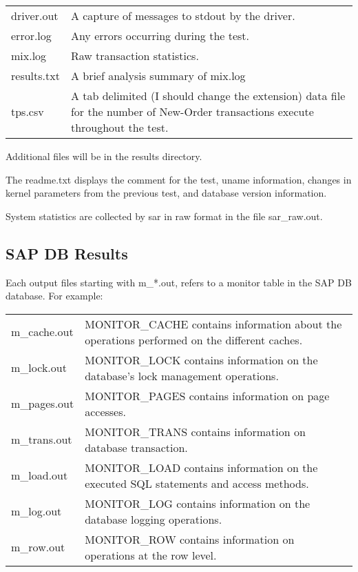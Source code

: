 \documentclass{article}
\begin{document}
\begin{tabular}[c]{ll}
driver.out	&	A capture of messages to stdout by the driver. \\
error.log	&	Any errors occurring during the test. \\
mix.log		&	Raw transaction statistics. \\
results.txt	&	A brief analysis summary of mix.log \\
tps.csv		&	A tab delimited (I should change the extension) data
			file for the number of New-Order transactions execute
			throughout the test. \\
\end{tabular}

\noindent
Additional files will be in the results directory.

\noindent
The readme.txt displays the comment for the test, uname  information, changes
in kernel parameters from the previous test, and database version information.

\noindent
System statistics are collected by sar in raw format in the file sar\_raw.out.

\subsection{SAP DB Results}

Each output files starting with m\_*.out, refers to a monitor table in the
SAP DB database.  For example:

\begin{tabular}[c]{ll}
m\_cache.out	&	MONITOR\_CACHE contains information about the operations
			performed on the different caches. \\
m\_lock.out	&	MONITOR\_LOCK contains information on the database's
			lock management operations. \\
m\_pages.out	&	MONITOR\_PAGES contains information on page accesses. \\
m\_trans.out	&	MONITOR\_TRANS contains information on database
			transaction. \\
m\_load.out	&	MONITOR\_LOAD contains information on the executed SQL
			statements and access methods. \\
m\_log.out	&	MONITOR\_LOG contains information on the database
			logging operations. \\
m\_row.out	&	MONITOR\_ROW contains information on operations at the
			row level. \\
\end{tabular}
\end{document}
